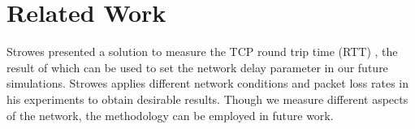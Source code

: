 \section{Related Work} \label{sec:related}

Strowes presented a solution to measure the TCP round trip time (RTT) \cite{Strowes:2013},
the result of which can be used to set the network delay parameter in our future simulations. 
Strowes applies different network conditions and packet loss rates in his experiments to 
obtain desirable results. Though we measure different aspects of the network, the methodology
can be employed in future work. 
